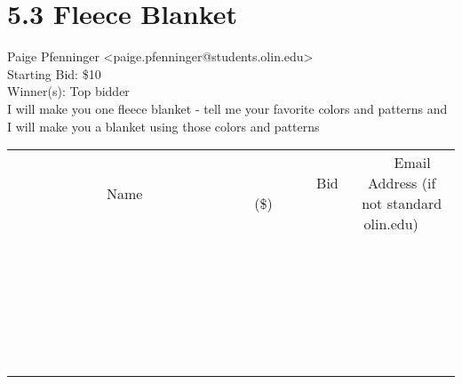 \documentclass[11pt]{article}
\begin{document}
					\section*{5.3 Fleece Blanket}
					Paige Pfenninger <paige.pfenninger@students.olin.edu> \\
					Starting Bid: \$10 \\
					Winner(s): Top bidder \\
					I will make you one fleece blanket - tell me your favorite colors and patterns and I will make you a blanket using those colors and patterns \\
					[6ex]
					\begin{tabular}{c c c}
						~~~~~~~~~~~~~Name~~~~~~~~~~~~~ & ~~~~~~~~~Bid (\$)~~~~~~~~~ & ~~~Email Address (if not standard olin.edu)~~~ \\
				
 & & \\
\hline
 & & \\
\hline
 & & \\
\hline
 & & \\
\hline
 & & \\
\hline
 & & \\
\hline
 & & \\
\hline
 & & \\
\hline
 & & \\
\hline
 & & \\
\hline
 & & \\
\hline
 & & \\
\hline
 & & \\
\hline
 & & \\
\hline
 & & \\
\hline
 & & \\
\hline
 & & \\
\hline
 & & \\
\hline
 & & \\
\hline
 & & \\
\hline
 & & \\
\hline
 & & \\
\hline
 & & \\
\hline
 & & \\
\hline
 & & \\
\hline
 & & \\
\hline
					\end{tabular}
					\clearpage
				
\end{document}
